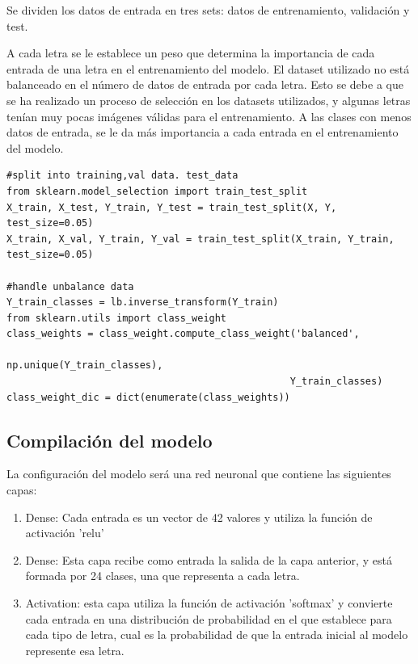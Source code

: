 \documentclass[../main.tex]{subfiles}
\begin{document}
Se dividen los datos de entrada en tres sets: datos de entrenamiento, validación y test. 

A cada letra se le establece un peso que determina la importancia de cada entrada  de una letra en el entrenamiento del modelo. El dataset utilizado no está balanceado en el número de datos de entrada por cada letra. Esto se debe a que se ha realizado un proceso de selección en los datasets utilizados, y algunas letras tenían muy pocas imágenes válidas para el entrenamiento. A las clases con menos datos de entrada, se le da más importancia a cada entrada en el entrenamiento del modelo.

\begin{lstlisting}[style=stylepython]
#split into training,val data. test_data
from sklearn.model_selection import train_test_split
X_train, X_test, Y_train, Y_test = train_test_split(X, Y, test_size=0.05)
X_train, X_val, Y_train, Y_val = train_test_split(X_train, Y_train, test_size=0.05)

#handle unbalance data 
Y_train_classes = lb.inverse_transform(Y_train)
from sklearn.utils import class_weight 
class_weights = class_weight.compute_class_weight('balanced',
                                                 np.unique(Y_train_classes),
                                                 Y_train_classes)
class_weight_dic = dict(enumerate(class_weights))
\end{lstlisting}

\newpage

\subsection{Compilación del modelo}
La configuración del modelo será una red neuronal que contiene las siguientes capas:
\begin{enumerate}
    \item Dense: Cada entrada es un vector de 42 valores y utiliza la función de activación 'relu'
    \item Dense: Esta capa recibe como entrada la salida de la capa anterior, y está formada por 24 clases, una que representa a cada letra.
    \item Activation: esta capa utiliza la función de activación 'softmax' y convierte cada entrada en una distribución de probabilidad en el que establece para cada tipo de letra, cual es la probabilidad de que la entrada inicial al modelo represente esa letra.
\end{enumerate}
\end{document}
